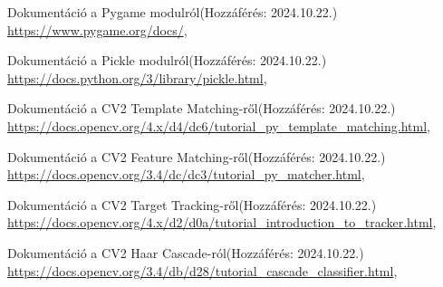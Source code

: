 \documentclass[12pt,a4paper]{article}
\begin{document}
\begin{thebibliography}{}
	Dokumentáció a Pygame modulról\hfill (Hozzáférés: 2024.10.22.) \\
	{\footnotesize \url{https://www.pygame.org/docs/}},
	
	Dokumentáció a Pickle modulról\hfill (Hozzáférés: 2024.10.22.) \\
	{\footnotesize \url{https://docs.python.org/3/library/pickle.html}},


	Dokumentáció a CV2 Template Matching-ről\hfill (Hozzáférés: 2024.10.22.) \\
	{\footnotesize \url{https://docs.opencv.org/4.x/d4/dc6/tutorial_py_template_matching.html}},
	
	Dokumentáció a CV2 Feature Matching-ről\hfill (Hozzáférés: 2024.10.22.) \\
	{\footnotesize \url{https://docs.opencv.org/3.4/dc/dc3/tutorial_py_matcher.html}},
	
	Dokumentáció a CV2 Target Tracking-ről\hfill (Hozzáférés: 2024.10.22.) \\
	{\footnotesize \url{https://docs.opencv.org/4.x/d2/d0a/tutorial_introduction_to_tracker.html}},
	
	Dokumentáció a CV2 Haar Cascade-ról\hfill (Hozzáférés: 2024.10.22.) \\
	{\footnotesize \url{https://docs.opencv.org/3.4/db/d28/tutorial_cascade_classifier.html}},
	
	

\end{thebibliography}
\end{document}

